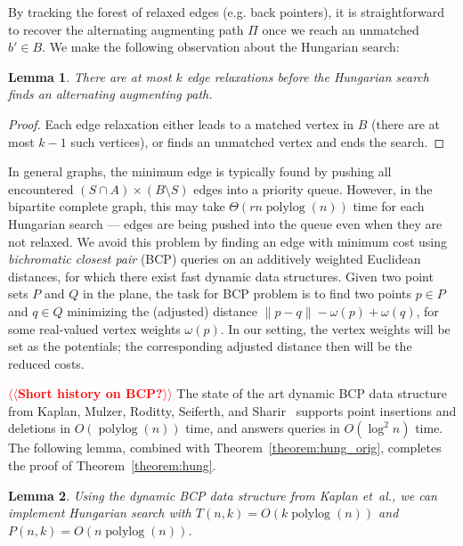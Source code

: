 \documentclass[11pt]{article}
\makeatletter
\def\etal{\textsl{et~al.}}
\def\polylog{\mathop{\mathrm{polylog}}}
\theoremstyle{plain}
\newtheorem{lemma}{Lemma}
\def\n@te#1{\textsf{\boldmath \textbf{$\langle\!\langle$#1$\rangle\!\rangle$}}\leavevmode}
\def\note#1{\textcolor{red}{\n@te{#1}}}
\makeatother
\begin{document}
By tracking the forest of relaxed edges (e.g. back pointers), it is
straightforward to recover the alternating augmenting path $\Pi$ once we reach
an unmatched $b' \in B$.
We make the following observation about the Hungarian search:

\begin{lemma}
\label{lemma:hungsearch_length}
There are at most $k$ edge relaxations before the Hungarian search finds an
alternating augmenting path.
\end{lemma}

\begin{proof}
Each edge relaxation either leads to a matched vertex in $B$ (there are at most
$k-1$ such vertices), or finds an unmatched vertex and ends the search.
\end{proof}

In general graphs, the minimum edge is typically found by pushing all
encountered $(S \cap A) \times (B \setminus S)$ edges into a priority queue.
However, in the bipartite complete graph, this may take $\Theta(rn\polylog(n))$
time for each Hungarian search --- edges are being pushed into the queue even when
they are not relaxed.
We avoid this problem by finding an  edge with minimum cost using \emph{bichromatic
closest pair} (BCP) queries on an additively weighted Euclidean distances,
for which there exist fast %
dynamic data structures.
Given two point sets
$P$ and $Q$ in the plane,
the task for BCP problem is to find two points $p \in P$ and $q \in Q$ minimizing the (adjusted) distance
$\|p - q\| - \omega(p) + \omega(q)$, for some real-valued vertex weights
$\omega(p)$.
In our setting, the vertex weights will be set as the potentials; the corresponding adjusted distance then will be the reduced costs.

\note{Short history on BCP?}
The state of the art dynamic BCP data structure from Kaplan, Mulzer,
Roditty, Seiferth, and Sharir~\cite{KMRSS17} supports point insertions and deletions in
$O(\polylog(n))$ time, and answers queries in $O(\log^2 n)$ time.
The following lemma, combined with Theorem~\ref{theorem:hung_orig}, completes
the proof of Theorem~\ref{theorem:hung}.

\begin{lemma}
\label{lemma:hs_time}
Using the dynamic BCP data structure from Kaplan \etal, we can implement
Hungarian search with $T(n, k) = O(k\polylog(n))$ and 
$P(n, k) = O(n\polylog(n))$.
\end{lemma}
\end{document}
